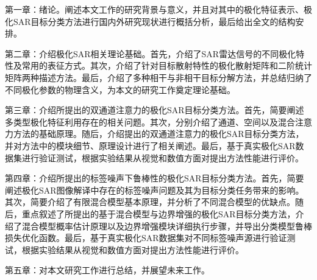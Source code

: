 第一章：绪论。阐述本文工作的研究背景与意义，并且对其中的极化特征表示、极化SAR目标分类方法进行国内外研究现状进行概括分析，最后给出全文的结构安排。

第二章：介绍极化SAR相关理论基础。首先，介绍了SAR雷达信号的不同极化特性及常用的表征方式。其次，介绍了针对目标散射特性的极化散射矩阵和二阶统计矩阵两种描述方法。最后，介绍了多种相干与非相干目标分解方法，并总结归纳了不同极化参数的物理含义，为本文的研究工作奠定理论基础。

第三章：介绍所提出的双通道注意力的极化SAR目标分类方法。首先，简要阐述多类型极化特征利用存在的相关问题。其次，分别介绍了通道、空间以及混合注意力方法的基础原理。随后，介绍提出的双通道注意力的极化SAR目标分类方法，并对方法中的模块细节、原理设计进行了相关阐述。最后，基于真实极化SAR数据集进行验证测试，根据实验结果从视觉和数值方面对提出方法性能进行评价。


第四章：介绍所提出的标签噪声下鲁棒性的极化SAR目标分类方法。首先，简要阐述极化SAR图像解译中存在的标签噪声问题及其为目标分类任务带来的影响。其次，简要介绍了有限混合模型基本原理，并分析了不同混合模型的优缺点。随后，重点叙述了所提出的基于混合模型与边界增强的极化SAR目标分类方法，介绍了混合模型概率估计原理以及边界增强模块详细执行步骤，并导出分类模型鲁棒损失优化函数。最后，基于真实极化SAR数据集对不同标签噪声源进行验证测试，根据实验结果从视觉和数值方面对提出方法性能进行评价。



第五章：对本文研究工作进行总结，并展望未来工作。